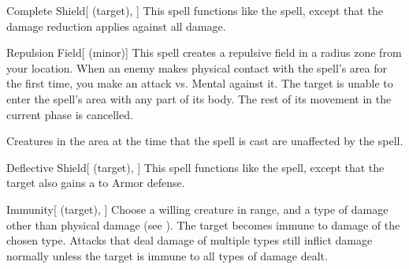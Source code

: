 \lowercase{\hypertarget{spell:Complete Shield}{}}\label{spell:Complete Shield}
\begin{attuneability}[\nth{2}]{\hypertarget{spell:Complete Shield}{Complete Shield}}[ (target), ]
This spell functions like the  spell, except that the damage reduction applies against all damage.
\end{attuneability}
\vspace{0.25em}



\lowercase{\hypertarget{spell:Repulsion Field}{}}\label{spell:Repulsion Field}
\begin{apability}[\nth{2}]{\hypertarget{spell:Repulsion Field}{Repulsion Field}}[ (minor)]
This spell creates a repulsive field in a \areamed radius zone from your location.
When an enemy makes physical contact with the spell's area for the first time, you make an attack vs. Mental against it.
\hit The target is unable to enter the spell's area with any part of its body.
The rest of its movement in the current phase is cancelled.

Creatures in the area at the time that the spell is cast are unaffected by the spell.
\end{apability}
\vspace{0.25em}



\lowercase{\hypertarget{spell:Deflective Shield}{}}\label{spell:Deflective Shield}
\begin{attuneability}[\nth{3}]{\hypertarget{spell:Deflective Shield}{Deflective Shield}}[ (target), ]
This spell functions like the  spell, except that the target also gains a   to Armor defense.
\end{attuneability}
\vspace{0.25em}



\lowercase{\hypertarget{spell:Immunity}{}}\label{spell:Immunity}
\begin{attuneability}[\nth{3}]{\hypertarget{spell:Immunity}{Immunity}}[ (target), ]
Choose a willing creature in \rngclose range, and a type of damage other than physical damage (see ).
The target becomes immune to damage of the chosen type.
Attacks that deal damage of multiple types still inflict damage normally unless the target is immune to all types of damage dealt.
\end{attuneability}
\vspace{0.25em}



